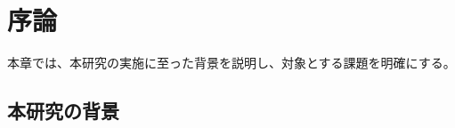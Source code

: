 \chapter{序論}
\label{chapter:introduction}

本章では、本研究の実施に至った背景を説明し、対象とする課題を明確にする。

\section{本研究の背景}
\label{section:background}
